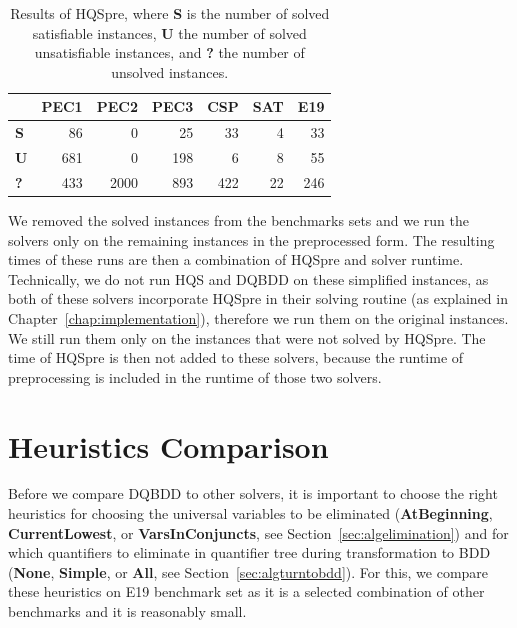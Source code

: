\documentclass[
  digital, %
  color,
  twoside, %
  table,   %
  nolof,     %
  nolot,     %
]{fithesis3}
\theoremstyle{definition}
\theoremstyle{remark}
\newcommand{\QEnone}{\textbf{None}}
\newcommand{\QEsimple}{\textbf{Simple}}
\newcommand{\QEall}{\textbf{All}}
\newcommand{\QUatbeginning}{\textbf{At\-Be\-gin\-ning}}
\newcommand{\QUcurrentlowest}{\textbf{CurrentLowest}}
\newcommand{\QUvarsinconjuncts}{\textbf{VarsInConjuncts}}
\begin{document}
\begin{table}[ht]
\centering
\caption{Results of HQSpre, where \textbf{S} is the number of solved satisfiable instances, \textbf{U} the number of solved unsatisfiable instances, and \textbf{?} the number of unsolved instances.}
\label{tab:HQSpre}
\begin{tabular}{c|r|r|r|r|r|r|}
\hhline{~*{6}{-}}
\cellcolor{white}                %
& \multicolumn{1}{c|}{\textbf{PEC1}} & \multicolumn{1}{c|}{\textbf{PEC2}} & \multicolumn{1}{c|}{\textbf{PEC3}} & \multicolumn{1}{c|}{\textbf{CSP}} & \multicolumn{1}{c|}{\textbf{SAT}} & \multicolumn{1}{c|}{\textbf{E19}} \\ \hline
\multicolumn{1}{|l|}{\textbf{S}} %
& \phantom{000}86 & \phantom{0000}0 & \phantom{000}25 & \phantom{000}33 & \phantom{0000}4 & \phantom{000}33 \\ \hline
\multicolumn{1}{|l|}{\textbf{U}} %
& 681 & 0 & 198 & 6 & 8 & 55 \\ \hline
\multicolumn{1}{|l|}{\textbf{?}} %
& 433 & \num{2000} & 893 & 422 & 22 & 246 \\ \hline
\end{tabular}
\end{table}

We removed the solved instances from the benchmarks sets and we run the solvers only on the remaining instances in the preprocessed form. The resulting times of these runs are then a combination of HQSpre and solver runtime. Technically, we do not run HQS and DQBDD on these simplified instances, as both of these solvers incorporate HQSpre in their solving routine (as explained in Chapter~\ref{chap:implementation}), therefore we run them on the original instances. We still run them only on the instances that were not solved by HQSpre. The time of HQSpre is then not added to these solvers, because the runtime of preprocessing is included in the runtime of those two solvers.

\section{Heuristics Comparison}
Before we compare DQBDD to other solvers, it is important to choose the right heuristics for choosing the universal variables to be eliminated (\QUatbeginning{}, \QUcurrentlowest{}, or \QUvarsinconjuncts{}, see Section~\ref{sec:algelimination}) and for which quantifiers to eliminate in quantifier tree during transformation to BDD (\QEnone{}, \QEsimple{}, or \QEall{}, see Section~\ref{sec:algturntobdd}). For this, we compare these heuristics on E19 benchmark set as it is a selected combination of other benchmarks and it is reasonably small. 
\end{document}
